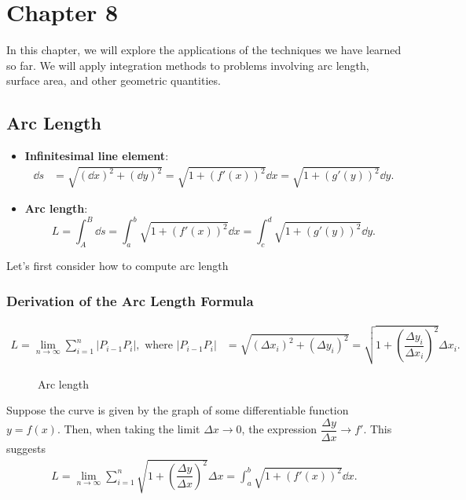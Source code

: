 \section{Chapter 8}
In this chapter, we will explore the applications of the techniques we have learned so far. We will apply integration methods to problems involving arc length, surface area, and other geometric quantities. 


\subsection{Arc Length}  

\begin{center}
\begin{tcolorbox}
    \begin{itemize}
        \item \textbf{Infinitesimal line element}:
        \begin{align*}
            \dd s &= \sqrt{(\dd x)^2 +  (\dd y)^2} = \sqrt{1 + \left(f'(x)\right)^2} \dd x = \sqrt{1 + \left(g'(y)\right)^2} \dd y.
        \end{align*}
        \item \textbf{Arc length}:
            \[L = \int_A^B \dd s = \int_a^b \sqrt{1 + \left(f'(x)\right)^2} \dd x = \int_c^d \sqrt{1 + \left(g'(y)\right)^2} \dd y.\]
    \end{itemize}
\end{tcolorbox}
\end{center}
Let’s first consider how to compute arc length
\subsubsection{Derivation of the Arc Length Formula}
\begin{align*}
    L = \lim_{n\to \infty} \sum_{i=1}^n |P_{i-1}P_i|, \text{ where } |P_{i-1}P_i| &= \sqrt{(\Delta x_i)^2 +  (\Delta y_i)^2} = \sqrt{1+\left(\dfrac{\Delta y_i}{\Delta x_i}\right)^2} \Delta x_i.
\end{align*}

\begin{figure}[ht]
    \centering
    \resizebox{0.5\textwidth}{!}{} %
    \caption{Arc length}
    \label{fig:arc length}
\end{figure}
Suppose the curve is given by the graph of some differentiable function $y = f(x)$. Then, when taking the limit $\Delta x \to 0$, the expression $\dfrac{\Delta y}{\Delta x} \to f'$. This suggests 
\begin{align*}
    L = \lim_{n\to \infty} \sum_{i=1}^n \sqrt{1+\left(\dfrac{\Delta y}{\Delta x}\right)^2} \Delta x = \int_a^b \sqrt{1+\left(f'(x)\right)^2} \dd x .
\end{align*}


